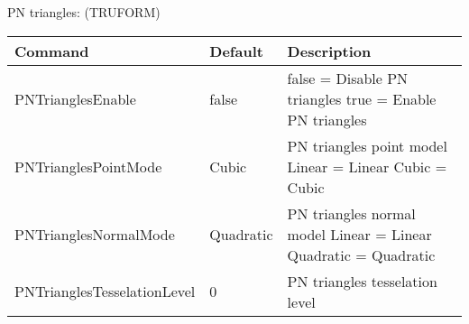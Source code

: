PN triangles: (TRUFORM)\\
\begin{tabular}{|p{4.5cm}|p{3cm}|p{9cm}|}
\hline
\textbf{Command} & \textbf{Default} & \textbf{Description}\\
\hline
PNTrianglesEnable           & false     & false = Disable PN triangles\newline
                                          true  = Enable PN triangles\\
\hline
PNTrianglesPointMode        & Cubic     & PN triangles point model\newline
                                          Linear = Linear\newline
                                          Cubic  = Cubic\\
\hline
PNTrianglesNormalMode       & Quadratic & PN triangles normal model\newline
                                          Linear    = Linear\newline
                                          Quadratic = Quadratic\\
\hline
PNTrianglesTesselationLevel & 0         & PN triangles tesselation level\\
\hline
\end{tabular}
      

